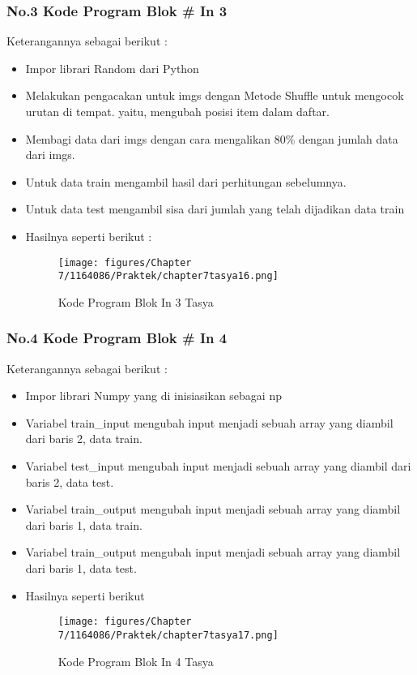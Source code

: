\subsubsection{No.3 Kode Program Blok \# In 3}

Keterangannya sebagai berikut :
\begin{itemize}
\item Impor librari Random dari Python
\item Melakukan pengacakan untuk imgs dengan Metode Shuffle  untuk mengocok urutan di tempat. yaitu, mengubah posisi item dalam daftar.
\item Membagi data dari imgs dengan cara mengalikan 80\% dengan jumlah data dari imgs.
\item Untuk data train mengambil hasil dari perhitungan sebelumnya.
\item Untuk data test mengambil sisa dari jumlah yang telah dijadikan data train
\item Hasilnya seperti berikut :
\begin{figure}[ht]
\centering
\texttt{[image: figures/Chapter 7/1164086/Praktek/chapter7tasya16.png]}
\caption{Kode Program Blok In 3 Tasya}
\label{Praktek}
\end{figure}
\end{itemize}

\subsubsection{No.4 Kode Program Blok \# In 4}

Keterangannya sebagai berikut :
\begin{itemize}
\item Impor librari Numpy yang di inisiasikan sebagai np
\item Variabel train\_input mengubah input menjadi sebuah array yang diambil dari baris 2, data train.
\item Variabel test\_input mengubah input menjadi sebuah array yang diambil dari baris 2, data test.
\item Variabel train\_output mengubah input menjadi sebuah array yang diambil dari baris 1, data train.
\item Variabel train\_output mengubah input menjadi sebuah array yang diambil dari baris 1, data test.
\item Hasilnya seperti berikut 
\begin{figure}[ht]
\centering
\texttt{[image: figures/Chapter 7/1164086/Praktek/chapter7tasya17.png]}
\caption{Kode Program Blok In 4 Tasya}
\label{Praktek}
\end{figure}
\end{itemize}

